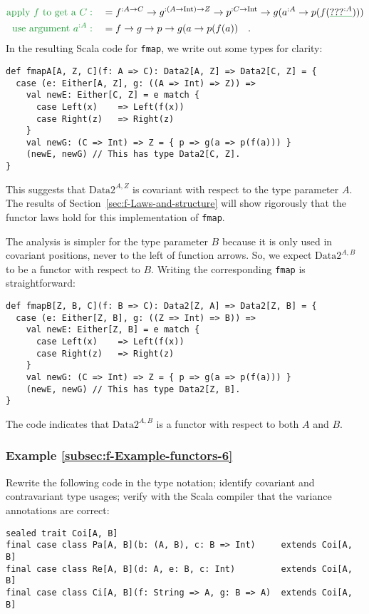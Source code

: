 \begin{align*}
{\color{greenunder}\text{apply }f\text{ to get a }C:}\quad & =f^{:A\rightarrow C}\rightarrow g^{:\left(A\rightarrow\text{Int}\right)\rightarrow Z}\rightarrow p^{:C\rightarrow\text{Int}}\rightarrow g(a^{:A}\rightarrow p(f(\gunderline{\text{???}^{:A}})))\\
{\color{greenunder}\text{use argument }a^{:A}:}\quad & =f\rightarrow g\rightarrow p\rightarrow g(a\rightarrow p(f(a))\quad.
\end{align*}
In the resulting Scala code for \lstinline!fmap!, we write out some
types for clarity:
\begin{lstlisting}
def fmapA[A, Z, C](f: A => C): Data2[A, Z] => Data2[C, Z] = {
  case (e: Either[A, Z], g: ((A => Int) => Z)) =>
    val newE: Either[C, Z] = e match {
      case Left(x)    => Left(f(x))
      case Right(z)   => Right(z)
    }
    val newG: (C => Int) => Z = { p => g(a => p(f(a))) }
    (newE, newG) // This has type Data2[C, Z].
}
\end{lstlisting}
This suggests that $\text{Data2}^{A,Z}$ is covariant with respect
to the type parameter $A$. The results of Section~\ref{sec:f-Laws-and-structure}
will show rigorously that the functor laws hold for this implementation
of \lstinline!fmap!.

The analysis is simpler for the type parameter $B$ because it is
only used in covariant positions, never to the left of function arrows.
So, we expect $\text{Data2}^{A,B}$ to be a functor with respect to
$B$. Writing the corresponding \lstinline!fmap! is straightforward:
\begin{lstlisting}
def fmapB[Z, B, C](f: B => C): Data2[Z, A] => Data2[Z, B] = {
  case (e: Either[Z, B], g: ((Z => Int) => B)) =>
    val newE: Either[Z, B] = e match {
      case Left(x)    => Left(f(x))
      case Right(z)   => Right(z)
    }
    val newG: (C => Int) => Z = { p => g(a => p(f(a))) }
    (newE, newG) // This has type Data2[Z, B].
}
\end{lstlisting}

The code indicates that $\text{Data2}^{A,B}$ is a functor with respect
to both $A$ and $B$.

\subsubsection{Example \label{subsec:f-Example-functors-6}\ref{subsec:f-Example-functors-6}}

Rewrite the following code in the type notation; identify covariant
and contravariant type usages; verify with the Scala compiler that
the variance annotations are correct:
\begin{lstlisting}
sealed trait Coi[A, B]
final case class Pa[A, B](b: (A, B), c: B => Int)     extends Coi[A, B]
final case class Re[A, B](d: A, e: B, c: Int)         extends Coi[A, B]
final case class Ci[A, B](f: String => A, g: B => A)  extends Coi[A, B]
\end{lstlisting}


